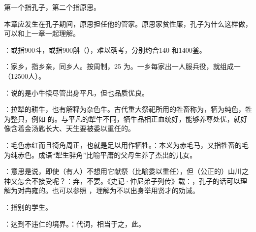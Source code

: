 {
\item 第一个指孔子，第二个指原思。

本章应发生在孔子期间，原思担任他的管家。原思家贫性廉，孔子为什么这样做，可以和上一章一起理解。

\item {}：或指900斗，或指900斛（），难以确考，分别约合140 和1400釜。
\item {}：家乡，指乡亲，同乡人。按周制，25 为。一乡每家出一人服兵役，就组成一（12500人）。
}
{}


{
\item {}：说的是小牛犊尽管出身平凡，但也品质优良。

：拉犁的耕牛，也有解释为杂色牛。古代重大祭祀所用的牲畜称为，牺为纯色，牲为整只，例如  的。与平凡的犁牛不同，牺牛品相正血统好，能够养尊处优，就好像含着金汤匙长大、天生要被委以重任的。

：毛色赤红而且犄角周正，也就是足以用作牺牲。：本义为赤毛马，又指牲畜的毛为纯赤色。成语“犁生骍角”比喻平庸的父母生养了杰出的儿女。

\item {}：意思是说，即使（有人）不想用它献祭（比喻委以重任），但（公正的）山川之神又怎会不接受呢？：弃，不要。《史记·仲尼弟子列传》载：，孔子的话可以理解为对冉雍的。也可以参照 ，理解为不以出身举用贤才的劝诫。
}
{}


{
\begin{lyblobitemize}
\item {}：指别的学生。
\item {}：达到不违仁的境界。：代词，相当于之，此。
\end{lyblobitemize}
}
{}


